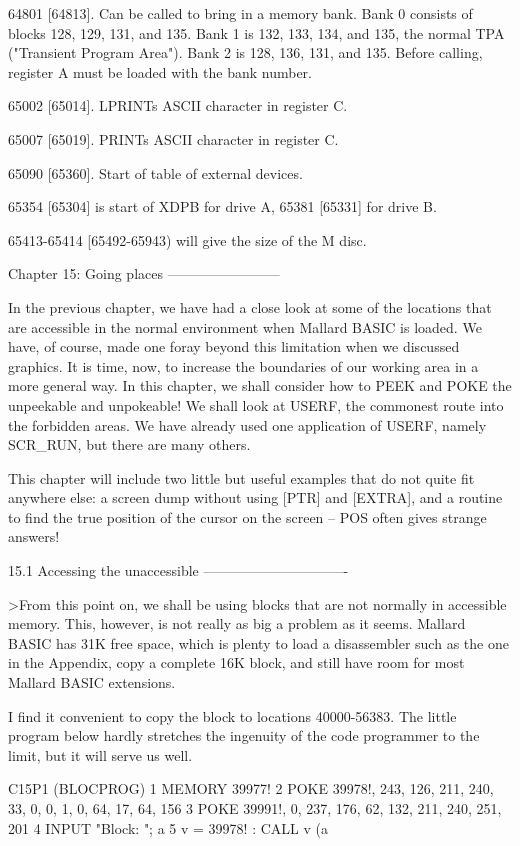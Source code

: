 64801  [64813].  Can be called to bring in a memory bank. Bank 0  consists  of 
blocks  128, 129, 131, and 135. Bank 1 is 132, 133, 134, and 135,  the  normal 
TPA  ("Transient  Program  Area"). Bank 2 is 128, 136, 131,  and  135.  Before 
calling, register A must be loaded with the bank number.

65002 [65014]. LPRINTs ASCII character in register C.

65007 [65019]. PRINTs ASCII character in register C.

65090 [65360]. Start of table of external devices.

65354 [65304] is start of XDPB for drive A, 65381 [65331] for drive B.

65413-65414 [65492-65943) will give the size of the M disc.


Chapter 15: Going places
------------------------

In  the  previous chapter, we have had a close look at some of  the  locations 
that are accessible in the normal environment when Mallard BASIC is loaded. We 
have,  of  course,  made one foray beyond this limitation  when  we  discussed 
graphics. It is time, now, to increase the boundaries of our working area in a 
more general way. In this chapter, we shall consider how to PEEK and POKE  the 
unpeekable  and unpokeable! We shall look at USERF, the commonest  route  into 
the  forbidden  areas. We have already used one application of  USERF,  namely 
SCR_RUN, but there are many others.

This chapter will include two little but useful examples that do not quite fit 
anywhere else: a screen dump without using [PTR] and [EXTRA], and a routine to 
find the true position of the cursor on the screen -- POS often gives  strange 
answers!


15.1 Accessing the unaccessible
-------------------------------

>From  this  point  on,  we shall be using blocks  that  are  not  normally  in 
accessible memory. This, however, is not really as big a problem as it  seems. 
Mallard BASIC has 31K free space, which is plenty to load a disassembler  such 
as the one in the Appendix, copy a complete 16K block, and still have room for 
most Mallard BASIC extensions.

I  find it convenient to copy the block to locations 40000-56383.  The  little 
program  below  hardly stretches the ingenuity of the code programmer  to  the 
limit, but it will serve us well.

        C15P1  (BLOCPROG)
        1 MEMORY 39977!
        2 POKE 39978!, 243, 126, 211, 240, 33, 0, 0, 1, 0, 64, 17, 64, 156
        3 POKE 39991!, 0, 237, 176, 62, 132, 211, 240, 251, 201
        4 INPUT "Block: "; a%
        5 v = 39978! : CALL v (a%


